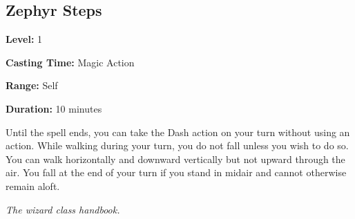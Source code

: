 \documentclass[12pt,letterpaper,twocolumn,openany,nodeprecatedcode,bg=none]{dndbook}
\begin{document}
\subsection{Zephyr Steps}\label{zephyr-steps}

\textbf{Level:} 1

\textbf{Casting Time:} Magic Action

\textbf{Range:} Self

\textbf{Duration:} 10 minutes

Until the spell ends, you can take the Dash action on your turn without
using an action. While walking during your turn, you do not fall unless
you wish to do so. You can walk horizontally and downward vertically but
not upward through the air. You fall at the end of your turn if you
stand in midair and cannot otherwise remain aloft.

\clearpage

\emph{The wizard class handbook.}
\end{document}
